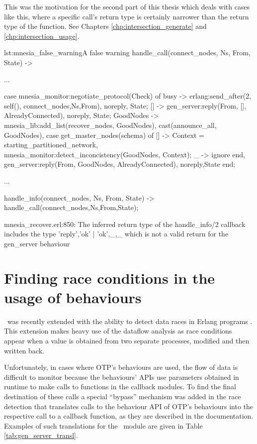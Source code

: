 This was the motivation for the second part of this thesis which deals
with cases like this, where a specific call's return type is certainly
narrower than the return type of the function. See
Chapters \ref{chp:intersection_generate}
and \ref{chp:intersection_usage}.

\begin{code}{lst:mnesia_false_warning}{A false warning}
handle_call({connect_nodes, Ns}, From, State) ->
    
    ...

    case mnesia_monitor:negotiate_protocol(Check) of
	busy -> 
	    erlang:send_after(2, self(), {connect_nodes,Ns,From}),
	    {noreply, State};
	[] ->
	    gen_server:reply(From, {[], AlreadyConnected}),
	    {noreply, State};
	GoodNodes ->
	    mnesia_lib:add_list(recover_nodes, GoodNodes),
	    cast({announce_all, GoodNodes}),
	    case get_master_nodes(schema) of 
		[] ->
		    Context = starting_partitioned_network,
		    mnesia_monitor:detect_inconcistency(GoodNodes, Context);
		_ -> %
		    ignore
	    end,
	    gen_server:reply(From, {GoodNodes, AlreadyConnected}),
	    {noreply,State}
    end;

...

handle_info({connect_nodes, Ns, From}, State) ->
    handle_call({connect_nodes,Ns},From,State);


mnesia_recover.erl:850: The inferred return type of the handle_info/2
callback includes the type {'reply','ok' | {'ok',_},_} which is not a
valid return for the gen_server behaviour

\end{code}

\section{Finding race conditions in the usage of behaviours}

\dr\ was recently extended with the ability to detect data races in
Erlang programs \cite{Races@PADL-10}. This extension makes heavy use of the
dataflow analysis as race conditions appear when a value is obtained
from two separate processes, modified and then written
back.

Unfortunately, in cases where OTP's behaviours are used, the flow of
data is difficult to monitor because the behaviours' APIs use
parameters obtained in runtime to make calls to functions in the
callback modules. To find the final destination of these calls a
special ``bypass'' mechanism was added in the race detection that
translates calls to the behaviour API of OTP's behaviours into the
respective call to a callback function, as they are described in the
documentation. Examples of such translations for the \genserv\
module are given in Table \ref{tab:gen_server_transl}.


